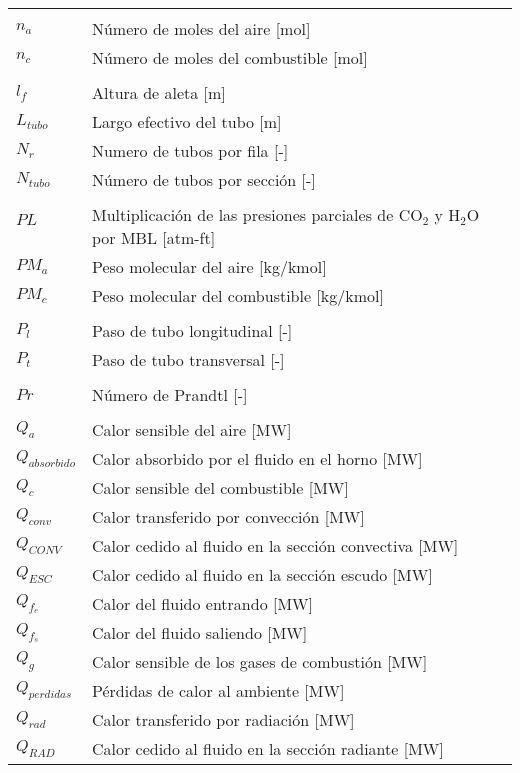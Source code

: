 \begin{tabular}{ll}
\\
\\
$n_a$  & Número de moles del aire [mol] \\
$n_c$  & Número de moles del combustible [mol] \\
\\
$l_f$   & Altura de aleta [m] \\
$L_{tubo}$ & Largo efectivo del tubo [m] \\
$N_r$   & Numero de tubos por fila [-] \\
$N_{tubo}$ & Número de tubos por sección [-] \\
\\
$PL$    & \multirow{2}{26em}{Multiplicación de las presiones parciales de CO$_2$ y H$_2$O por MBL [atm-ft]} \\
\\
$PM_a$    & Peso molecular del aire [kg/kmol]\\
$PM_c$    & Peso molecular del combustible [kg/kmol]\\
\\
$P_l$   & Paso de tubo longitudinal [-]\\
$P_t$   & Paso de tubo transversal [-]\\
\\
$Pr$    & Número de Prandtl [-]\\
\\
$Q_{a}$    & Calor sensible del aire [MW] \\
$Q_{absorbido}$ & Calor absorbido por el fluido en el horno [MW] \\
$Q_{c}$    & Calor sensible del combustible [MW] \\
$Q_{conv}$ & Calor transferido por convección [MW] \\
$Q_{CONV}$ & Calor cedido al fluido en la sección convectiva [MW] \\
$Q_{ESC}$ & Calor cedido al fluido en la sección escudo [MW] \\
$Q_{f_e}$ & Calor del fluido entrando [MW] \\
$Q_{f_s}$ & Calor del fluido saliendo [MW] \\
$Q_{g}$   & Calor sensible de los gases de combustión [MW] \\
$Q_{perdidas}$  & Pérdidas de calor al ambiente [MW] \\
$Q_{rad}$ & Calor transferido por radiación [MW] \\
$Q_{RAD}$ & Calor cedido al fluido en la sección radiante [MW] \\

\end{tabular}
